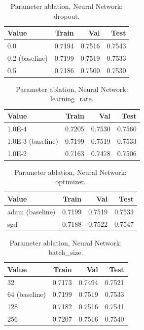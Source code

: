 \begin{table}[ht]
\centering
\small
\caption{Parameter ablation, Neural Network: dropout.}
\label{tab:ablation-neural-dropout}
\begin{tabular}{lrrr}
\toprule
Value & Train & Val & Test \\
\midrule
0.0 & 0.7194 & 0.7516 & 0.7543 \\
0.2 (baseline) & 0.7199 & 0.7519 & 0.7533 \\
0.5 & 0.7186 & 0.7500 & 0.7530 \\
\bottomrule
\end{tabular}
\end{table}

\begin{table}[ht]
\centering
\small
\caption{Parameter ablation, Neural Network: learning\_rate.}
\label{tab:ablation-neural-learning-rate}
\begin{tabular}{lrrr}
\toprule
Value & Train & Val & Test \\
\midrule
1.0E-4 & 0.7205 & 0.7530 & 0.7560 \\
1.0E-3 (baseline) & 0.7199 & 0.7519 & 0.7533 \\
1.0E-2 & 0.7163 & 0.7478 & 0.7506 \\
\bottomrule
\end{tabular}
\end{table}

\begin{table}[ht]
\centering
\small
\caption{Parameter ablation, Neural Network: optimizer.}
\label{tab:ablation-neural-optimizer}
\begin{tabular}{lrrr}
\toprule
Value & Train & Val & Test \\
\midrule
adam (baseline) & 0.7199 & 0.7519 & 0.7533 \\
sgd & 0.7188 & 0.7522 & 0.7547 \\
\bottomrule
\end{tabular}
\end{table}

\begin{table}[ht]
\centering
\small
\caption{Parameter ablation, Neural Network: batch\_size.}
\label{tab:ablation-neural-batch-size}
\begin{tabular}{lrrr}
\toprule
Value & Train & Val & Test \\
\midrule
32 & 0.7173 & 0.7494 & 0.7521 \\
64 (baseline) & 0.7199 & 0.7519 & 0.7533 \\
128 & 0.7182 & 0.7516 & 0.7541 \\
256 & 0.7207 & 0.7516 & 0.7540 \\
\bottomrule
\end{tabular}
\end{table}

